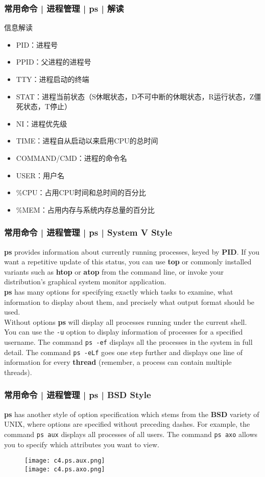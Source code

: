 \begin{frame}
  \frametitle{常用命令 | 进程管理 | ps | 解读}
  \begin{block}{信息解读}
    \begin{itemize}
      \item PID：进程号
      \item PPID：父进程的进程号
      \item TTY：进程启动的终端
      \item STAT：进程当前状态（S休眠状态，D不可中断的休眠状态，R运行状态，Z僵死状态，T停止）
      \item NI：进程优先级
      \item TIME：进程自从启动以来启用CPU的总时间
      \item COMMAND/CMD：进程的命令名
      \item USER：用户名
      \item \%CPU：占用CPU时间和总时间的百分比
      \item \%MEM：占用内存与系统内存总量的百分比
    \end{itemize}
  \end{block}
\end{frame}

\begin{frame}[fragile]
  \frametitle{常用命令 | 进程管理 | ps | System V Style}
  \textbf{ps} provides information about currently running processes, keyed by \textbf{PID}. If you want a repetitive update of this status, you can use \textbf{top} or commonly installed variants such as \textbf{htop} or \textbf{atop} from the command line, or invoke your distribution's graphical system monitor application.\\
  \vspace{0.2cm}
  \textbf{ps} has many options for specifying exactly which tasks to examine, what information to display about them, and precisely what output format should be used.\\
  \vspace{0.2cm}
  Without options \textbf{ps} will display all processes running under the current shell. You can use the \verb|-u| option to display information of processes for a specified username. The command \verb|ps -ef| displays all the processes in the system in full detail. The command \verb|ps -eLf| goes one step further and displays one line of information for every \textbf{thread} (remember, a process can contain multiple threads).
\end{frame}

\begin{frame}[fragile]
  \frametitle{常用命令 | 进程管理 | ps | BSD Style}
  \textbf{ps} has another style of option specification which stems from the \textbf{BSD} variety of UNIX, where options are specified without preceding dashes.  For example, the command \verb|ps aux| displays all processes of all users. The command \verb|ps axo| allows you to specify which attributes you want to view.
  \begin{figure}
    \centering
    \texttt{[image: c4.ps.aux.png]}\\
    \texttt{[image: c4.ps.axo.png]}
  \end{figure}
\end{frame}


